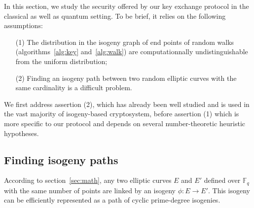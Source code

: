 \documentclass{article}
\newcommand{\F}{\mathbb{F}}
\theoremstyle{definition}
\newtheorem{prob}[theorem]{Problem}
\DeclareMathOperator{\Card}{Card}
\begin{document}




In this section, we study the security offered by our key exchange protocol
in the classical as well as quantum setting. To be brief, it relies on
the following assumptions:

\begin{itemize}
\item[(1)] The distribution in the isogeny graph of
end points of random walks (algorithms~\ref{alg:key} and~\ref{alg:walk})
are computationnally undistinguishable from the uniform distribution;
\item[(2)] Finding an isogeny path between two random elliptic curves with the
same cardinality is a difficult problem.
\end{itemize}

We first address assertion (2), which has already been well studied and
is used in the vast majority of isogeny-based cryptosystem, before
assertion (1) which is more specific to our protocol and depends on
several number-theoretic heuristic hypotheses.

\subsection{Finding isogeny paths}

According to section~\ref{sec:math}, any two elliptic curves $E$
and $E'$ defined over $\F_q$ with the same number of points are
linked by an isogeny $\phi: E\to E'$. This isogeny can be
efficiently represented as a path of cyclic prime-degree isogenies.
\end{document}
